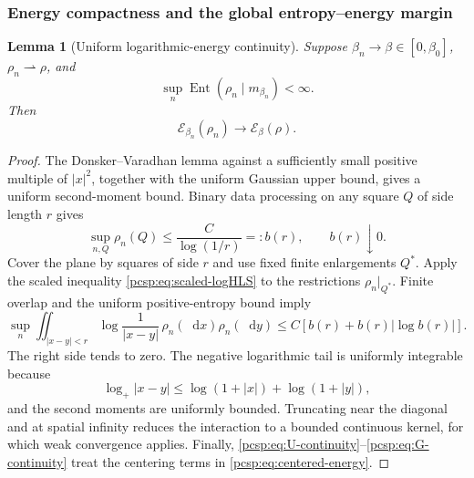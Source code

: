 \documentclass[11pt,reqno]{amsart}
\numberwithin{equation}{section}
\theoremstyle{plain}
\newtheorem{lemma}[lemma]{Lemma}
\theoremstyle{definition}
\newcommand{\dd}{\mathop{}\!\mathrm d}
\newcommand{\be}{\beta}
\newcommand{\Ent}{\operatorname{Ent}}
\newcommand{\Ecal}{\mathcal E}
\begin{document}
\subsubsection{Energy compactness and the global entropy--energy margin}

\begin{lemma}[Uniform logarithmic-energy continuity]\label{pcsp:lem:energy-continuity}
Suppose $\be_n\to\be\in[0,\be_0]$, $\rho_n\rightharpoonup\rho$, and
\begin{equation}\label{pcsp:eq:entropy-bounded}
 \sup_n\Ent(\rho_n\mid m_{\be_n})<\infty.
\end{equation}
Then
\begin{equation}\label{pcsp:eq:energy-continuity}
 \Ecal_{\be_n}(\rho_n)\longrightarrow\Ecal_\be(\rho).
\end{equation}
\end{lemma}

\begin{proof}
The Donsker--Varadhan lemma against a sufficiently small positive multiple of $|x|^2$, together with the uniform Gaussian upper bound, gives a uniform second-moment bound.  Binary data processing on any square $Q$ of side length $r$ gives
\begin{equation}\label{pcsp:eq:square-mass}
 \sup_{n,Q}\rho_n(Q)\leq\frac C{\log(1/r)}=:b(r),
 \qquad b(r)\downarrow0.
\end{equation}
Cover the plane by squares of side $r$ and use fixed finite enlargements $Q^*$.  Apply the scaled inequality \eqref{pcsp:eq:scaled-logHLS} to the restrictions $\rho_n|_{Q^*}$.  Finite overlap and the uniform positive-entropy bound imply
\begin{equation}\label{pcsp:eq:near-diagonal-UI}
 \sup_n\iint_{|x-y|<r}
 \log\frac1{|x-y|}\,\rho_n(\dd x)\rho_n(\dd y)
 \leq C\left[b(r)+b(r)|\log b(r)|\right].
\end{equation}
The right side tends to zero.  The negative logarithmic tail is uniformly integrable because
\begin{equation}\label{pcsp:eq:negative-log-tail}
 \log_+|x-y|
 \leq\log(1+|x|)+\log(1+|y|),
\end{equation}
and the second moments are uniformly bounded.  Truncating near the diagonal and at spatial infinity reduces the interaction to a bounded continuous kernel, for which weak convergence applies.  Finally, \eqref{pcsp:eq:U-continuity}--\eqref{pcsp:eq:G-continuity} treat the centering terms in \eqref{pcsp:eq:centered-energy}.
\end{proof}
\end{document}
